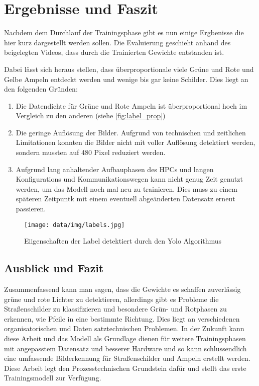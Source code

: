 \chapter{Ergebnisse und Faszit}
Nachdem dem Durchlauf der Trainingsphase gibt es nun einige Ergbenisse die hier kurz dargestellt werden sollen. Die Evaluierung geschieht anhand des beigelegten Videos, dass durch die Trainierten Gewichte entstanden ist.

Dabei lässt sich heraus stellen, dass überproportionale viele Grüne und Rote und Gelbe Ampeln entdeckt werden und wenige bis gar keine Schilder. Dies liegt an den folgenden Gründen:
 
\begin{enumerate}
    \item Die Datendichte für Grüne und Rote Ampeln ist überproportional hoch im Vergleich zu den anderen (siehe \autoref{fig:label_prop})
    \item Die geringe Auflösung der Bilder. Aufgrund von technischen und zeitlichen Limitationen konnten die Bilder nicht mit voller Auflösung detektiert werden, sondern mussten auf 480 Pixel reduziert werden.
    \item Aufgrund lang anhaltender Aufbauphasen des HPCs und langen Konfigurations und Kommunikationswegen kann nicht genug Zeit genutzt werden, um das Modell noch mal neu zu trainieren. Dies muss zu einem späteren Zeitpuntk mit einem eventuell abgeänderten Datensatz erneut passieren.
\end{enumerate}

\begin{figure}
    \texttt{[image: data/img/labels.jpg]}
    \caption{Eiigenschaften der Label detektiert durch den Yolo Algorithmus}
    \label{fig:label_prop}
\end{figure}

\section{Ausblick und Fazit}

Zusammenfassend kann man sagen, dass die Gewichte es schaffen zuverlässig grüne und rote Lichter zu detektieren, allerdings gibt es Probleme die Straßenschilder zu klassifizieren und besondere Grün- und Rotphasen zu erkennen, wie Pfeile in eine bestimmte Richtung. Dies liegt an verschiedenen organisatorischen und Daten satztechnischen Problemen. In der Zukunft kann diese Arbeit und das Modell als Grundlage dienen für weitere Trainingsphasen mit angepasstem Datensatz und besserer Hardware und so kann schlussendlich eine umfassende Bilderkennung für Straßenschilder und Ampeln erstellt werden. Diese Arbeit legt den Prozesstechnischen Grundstein dafür und stellt das erste Trainingsmodell zur Verfügung.